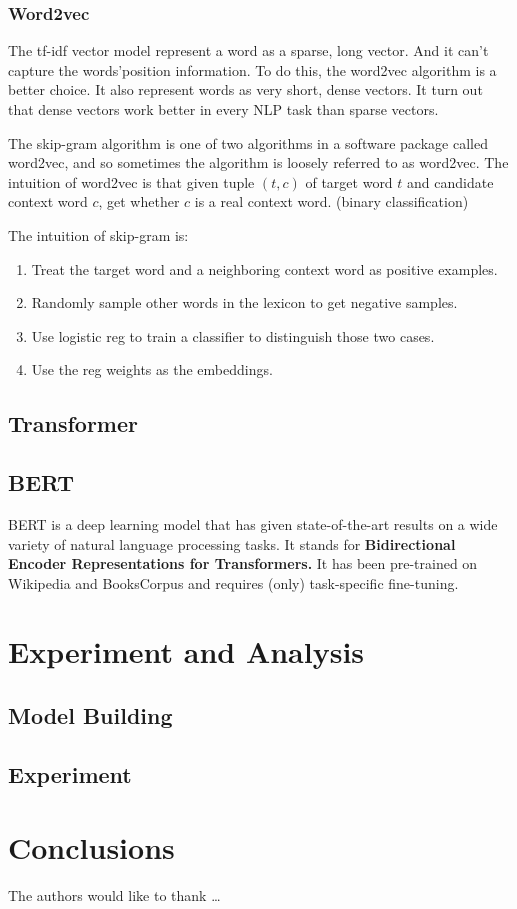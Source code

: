 \subsubsection{Word2vec}
The tf-idf vector model represent a word as a sparse, long vector. 
And it can't capture the words'position information. 
To do this, the word2vec algorithm is a better choice.
It also represent words as very short, dense vectors. 
It turn out that dense vectors work better in every NLP task than sparse vectors.

The skip-gram algorithm is one of two algorithms in a software package called word2vec,
and so sometimes the algorithm is loosely referred to as word2vec. The intuition of word2vec is that
given tuple $(t, c)$ of target word $t$ and candidate context word $c$, get whether $c$ is a real context word. (binary classification)

The intuition of skip-gram is:
\begin{enumerate}
    \item Treat the target word and a neighboring context word as positive examples.
    \item Randomly sample other words in the lexicon to get negative samples.
    \item Use logistic reg to train a classifier to distinguish those two cases.
    \item Use the reg weights as the embeddings.
\end{enumerate}
\subsection{Transformer}
\subsection{BERT}
BERT is a deep learning model that has given state-of-the-art results on 
a wide variety of natural language processing tasks. 
It stands for \textbf{Bidirectional Encoder Representations for Transformers.}
It has been pre-trained on Wikipedia and BooksCorpus and requires (only) task-specific fine-tuning.
\section{Experiment and Analysis} \label{sec-experiment}
\subsection{Model Building}
\subsection{Experiment}
\section{Conclusions} \label{sec-conclusions}


The authors would like to thank \ldots

